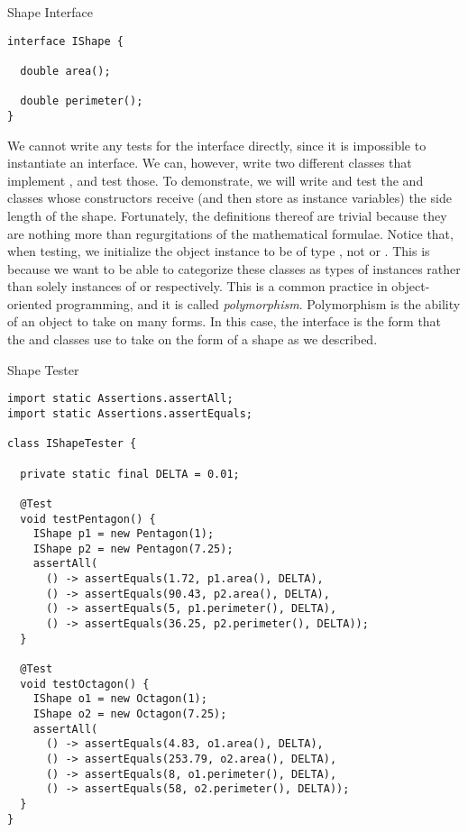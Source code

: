 \begin{cl}{Shape Interface}
\begin{lstlisting}[language=MyJava]
interface IShape {

  double area();

  double perimeter();
}
\end{lstlisting}
\end{cl}

We cannot write any tests for the  interface directly, since it is impossible to instantiate an interface. We can, however, write two different classes that implement , and test those. To demonstrate, we will write and test the  and  classes whose constructors receive (and then store as instance variables) the side length of the shape. Fortunately, the definitions thereof are trivial because they are nothing more than regurgitations of the mathematical formulae. Notice that, when testing, we initialize the object instance to be of type , not  or . This is because we want to be able to categorize these classes as types of  instances rather than solely instances of  or  respectively. This is a common practice in object-oriented programming, and it is called \textit{polymorphism}. Polymorphism is the ability of an object to take on many forms. In this case, the  interface is the form that the  and  classes use to take on the form of a shape as we described.

\begin{cl}{Shape Tester}
\begin{lstlisting}[language=MyJava]
import static Assertions.assertAll;
import static Assertions.assertEquals;

class IShapeTester {

  private static final DELTA = 0.01;
  
  @Test
  void testPentagon() {
    IShape p1 = new Pentagon(1);
    IShape p2 = new Pentagon(7.25);
    assertAll(
      () -> assertEquals(1.72, p1.area(), DELTA),
      () -> assertEquals(90.43, p2.area(), DELTA),
      () -> assertEquals(5, p1.perimeter(), DELTA),
      () -> assertEquals(36.25, p2.perimeter(), DELTA));
  }

  @Test
  void testOctagon() {
    IShape o1 = new Octagon(1);
    IShape o2 = new Octagon(7.25);
    assertAll(
      () -> assertEquals(4.83, o1.area(), DELTA),
      () -> assertEquals(253.79, o2.area(), DELTA),
      () -> assertEquals(8, o1.perimeter(), DELTA),
      () -> assertEquals(58, o2.perimeter(), DELTA));
  }
}
\end{lstlisting}
\end{cl}

